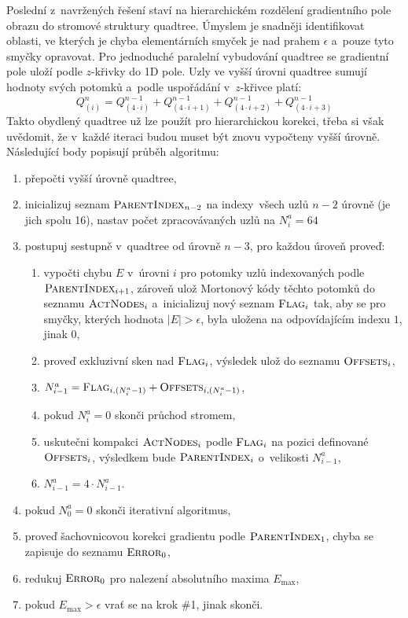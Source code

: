\documentclass[11pt,a4paper,oneside]{article}
\begin{document}
	Poslední z~navržených řešení staví na hierarchickém rozdělení gradientního pole obrazu do
	stromové struktury quadtree. Úmyslem je snadněji identifikovat oblasti, ve kterých je
	chyba elementárních smyček je nad prahem $\epsilon$ a~pouze tyto smyčky opravovat. Pro jednoduché paralelní
	vybudování quadtree se gradientní pole uloží podle $z$-křivky do 1D pole. Uzly ve vyšší
	úrovni quadtree sumují hodnoty svých potomků a~podle uspořádání v~$z$-křivce platí:
	\begin{equation}	
		Q_{(i)}^n = Q_{(4 \cdot i)}^{n - 1} + Q_{(4 \cdot i + 1)}^{n - 1} +
		            Q_{(4 \cdot i + 2)}^{n - 1} + Q_{(4 \cdot i + 3)}^{n - 1}
		\label{eq:avg}
	\end{equation}
	Takto obydlený quadtree už lze použít pro hierarchickou korekci, třeba si však uvědomit,
	že v~každé iteraci budou muset být znovu vypočteny vyšší úrovně. Následující body popisují
	průběh algoritmu:
	\begin{enumerate}
		\item přepočti vyšší úrovně quadtree,
		\item inicializuj seznam $\textsc{ParentIndex}_{n - 2}$ na indexy~všech uzlů $n - 2$ úrovně (je jich spolu 16),
		      nastav počet zpracovávaných uzlů na $N_i^a = 64$
		\item postupuj sestupně v~quadtree od úrovně $n - 3$, pro každou úroveň proveď:
		\begin{enumerate}
			\item vypočti chybu $E$ v~úrovni $i$ pro potomky uzlů indexovaných podle $\textsc{ParentIndex}_{i + 1}$,
			      zároveň ulož Mortonový kódy těchto potomků do seznamu $\textsc{ActNodes}_i$ a~inicializuj
			      nový seznam $\textsc{Flag}_i$ tak, aby se pro smyčky, kterých hodnota $|E| > \epsilon$, byla
			      uložena na odpovídajícím indexu $1$, jinak $0$,
			\item proveď exkluzivní sken nad $\textsc{Flag}_i$, výsledek ulož do seznamu $\textsc{Offsets}_i$,
			\item $N_{i - 1}^a = \textsc{Flag}_{i, (N_i^a - 1)} + \textsc{Offsets}_{i, (N_i^a - 1)}$,
			\item pokud $N_i^a = 0$ skonči průchod stromem,
			\item uskutečni kompakci $\textsc{ActNodes}_i$ podle $\textsc{Flag}_i$ na pozici definované $\textsc{Offsets}_i$,
			      výsledkem bude $\textsc{ParentIndex}_i$ o~velikosti $N_{i - 1}^a$,
			\item $N_{i - 1}^a = 4 \cdot N_{i - 1}^a$.
		\end{enumerate}
		\item pokud $N_0^a = 0$ skonči iterativní algoritmus,
		\item proveď šachovnicovou korekci gradientu podle $\textsc{ParentIndex}_1$,
		      chyba se zapisuje do seznamu $\textsc{Error}_0$,
		\item redukuj $\textsc{Error}_0$ pro nalezení absolutního maxima $E_{\max}$,
		\item pokud $E_{\max} > \epsilon$ vrať se na krok \#1, jinak skonči.
	\end{enumerate}
\end{document}
